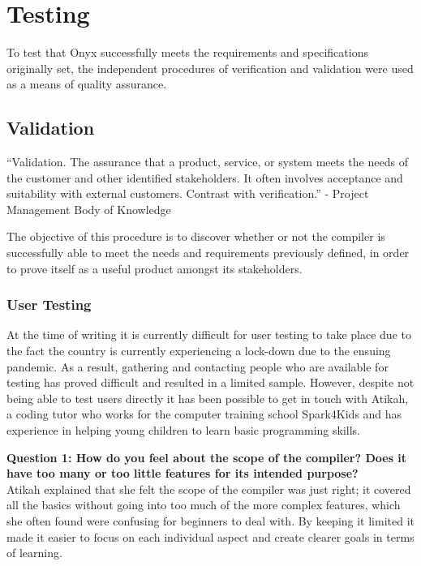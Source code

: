 \documentclass[
]{report}
\begin{document}
\chapter{Testing}
To test that Onyx successfully meets the requirements and specifications
originally set, the independent procedures of verification and
validation were used as a means of quality assurance.

\section{Validation}
``Validation. The assurance that a product, service, or system meets the
needs of the customer and other identified stakeholders. It often
involves acceptance and suitability with external customers. Contrast
with verification.'' - Project Management Body of Knowledge \cite{pmbok-book}

The objective of this procedure is to discover whether or not the
compiler is successfully able to meet the needs and requirements
previously defined, in order to prove itself as a useful product amongst
its stakeholders.

\subsection{User Testing}
At the time of writing it is currently difficult for user testing to
take place due to the fact the country is currently experiencing a
lock-down due to the ensuing pandemic. As a result, gathering and
contacting people who are available for testing has proved difficult and
resulted in a limited sample. However, despite not being able to test
users directly it has been possible to get in touch with Atikah, a
coding tutor who works for the computer training school Spark4Kids and
has experience in helping young children to learn basic programming
skills.

\textbf{Question 1: How do you feel about the scope of the compiler?
Does it have too many or too little features for its intended
purpose?}\\
Atikah explained that she felt the scope of the compiler was just right;
it covered all the basics without going into too much of the more
complex features, which she often found were confusing for beginners to
deal with. By keeping it limited it made it easier to focus on each
individual aspect and create clearer goals in terms of learning.
\end{document}
